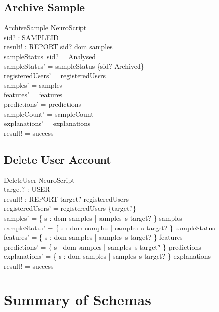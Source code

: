 \documentclass[12pt,a4paper]{article}
\begin{document}
\subsection{Archive Sample}

\begin{schema}{ArchiveSample}
\Delta NeuroScript \\
sid? : SAMPLEID \\
result! : REPORT
\where
sid? \in dom samples \\
sampleStatus~sid? = Analysed \\
sampleStatus' = sampleStatus \oplus \{sid? \mapsto Archived\} \\
registeredUsers' = registeredUsers \\
samples' = samples \\
features' = features \\
predictions' = predictions \\
sampleCount' = sampleCount \\
explanations' = explanations \\
result! = success
\end{schema}

\subsection{Delete User Account}

\begin{schema}{DeleteUser}
\Delta NeuroScript \\
target? : USER \\
result! : REPORT
\where
target? \in registeredUsers \\
registeredUsers' = registeredUsers \setminus \{target?\} \\
samples' = \{ s : dom samples | samples~s \neq target? \} \ndres samples \\
sampleStatus' = \{ s : dom samples | samples~s \neq target? \} \ndres sampleStatus \\
features' = \{ s : dom samples | samples~s \neq target? \} \ndres features \\
predictions' = \{ s : dom samples | samples~s \neq target? \} \ndres predictions \\
explanations' = \{ s : dom samples | samples~s \neq target? \} \ndres explanations \\
result! = success
\end{schema}

\section{Summary of Schemas}
\end{document}
